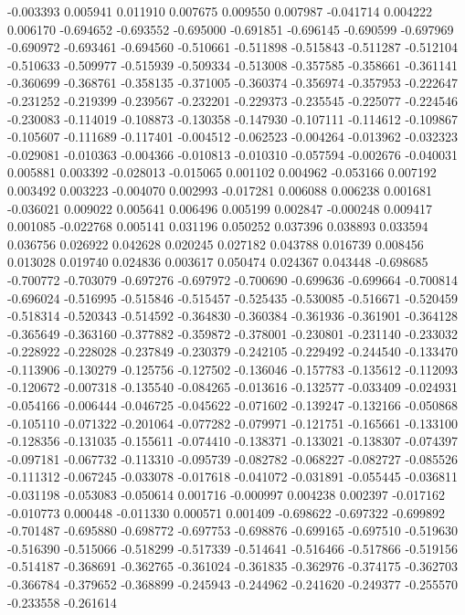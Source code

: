 -0.003393
0.005941
0.011910
0.007675
0.009550
0.007987
-0.041714
0.004222
0.006170
-0.694652
-0.693552
-0.695000
-0.691851
-0.696145
-0.690599
-0.697969
-0.690972
-0.693461
-0.694560
-0.510661
-0.511898
-0.515843
-0.511287
-0.512104
-0.510633
-0.509977
-0.515939
-0.509334
-0.513008
-0.357585
-0.358661
-0.361141
-0.360699
-0.368761
-0.358135
-0.371005
-0.360374
-0.356974
-0.357953
-0.222647
-0.231252
-0.219399
-0.239567
-0.232201
-0.229373
-0.235545
-0.225077
-0.224546
-0.230083
-0.114019
-0.108873
-0.130358
-0.147930
-0.107111
-0.114612
-0.109867
-0.105607
-0.111689
-0.117401
-0.004512
-0.062523
-0.004264
-0.013962
-0.032323
-0.029081
-0.010363
-0.004366
-0.010813
-0.010310
-0.057594
-0.002676
-0.040031
0.005881
0.003392
-0.028013
-0.015065
0.001102
0.004962
-0.053166
0.007192
0.003492
0.003223
-0.004070
0.002993
-0.017281
0.006088
0.006238
0.001681
-0.036021
0.009022
0.005641
0.006496
0.005199
0.002847
-0.000248
0.009417
0.001085
-0.022768
0.005141
0.031196
0.050252
0.037396
0.038893
0.033594
0.036756
0.026922
0.042628
0.020245
0.027182
0.043788
0.016739
0.008456
0.013028
0.019740
0.024836
0.003617
0.050474
0.024367
0.043448
-0.698685
-0.700772
-0.703079
-0.697276
-0.697972
-0.700690
-0.699636
-0.699664
-0.700814
-0.696024
-0.516995
-0.515846
-0.515457
-0.525435
-0.530085
-0.516671
-0.520459
-0.518314
-0.520343
-0.514592
-0.364830
-0.360384
-0.361936
-0.361901
-0.364128
-0.365649
-0.363160
-0.377882
-0.359872
-0.378001
-0.230801
-0.231140
-0.233032
-0.228922
-0.228028
-0.237849
-0.230379
-0.242105
-0.229492
-0.244540
-0.133470
-0.113906
-0.130279
-0.125756
-0.127502
-0.136046
-0.157783
-0.135612
-0.112093
-0.120672
-0.007318
-0.135540
-0.084265
-0.013616
-0.132577
-0.033409
-0.024931
-0.054166
-0.006444
-0.046725
-0.045622
-0.071602
-0.139247
-0.132166
-0.050868
-0.105110
-0.071322
-0.201064
-0.077282
-0.079971
-0.121751
-0.165661
-0.133100
-0.128356
-0.131035
-0.155611
-0.074410
-0.138371
-0.133021
-0.138307
-0.074397
-0.097181
-0.067732
-0.113310
-0.095739
-0.082782
-0.068227
-0.082727
-0.085526
-0.111312
-0.067245
-0.033078
-0.017618
-0.041072
-0.031891
-0.055445
-0.036811
-0.031198
-0.053083
-0.050614
0.001716
-0.000997
0.004238
0.002397
-0.017162
-0.010773
0.000448
-0.011330
0.000571
0.001409
-0.698622
-0.697322
-0.699892
-0.701487
-0.695880
-0.698772
-0.697753
-0.698876
-0.699165
-0.697510
-0.519630
-0.516390
-0.515066
-0.518299
-0.517339
-0.514641
-0.516466
-0.517866
-0.519156
-0.514187
-0.368691
-0.362765
-0.361024
-0.361835
-0.362976
-0.374175
-0.362703
-0.366784
-0.379652
-0.368899
-0.245943
-0.244962
-0.241620
-0.249377
-0.255570
-0.233558
-0.261614
